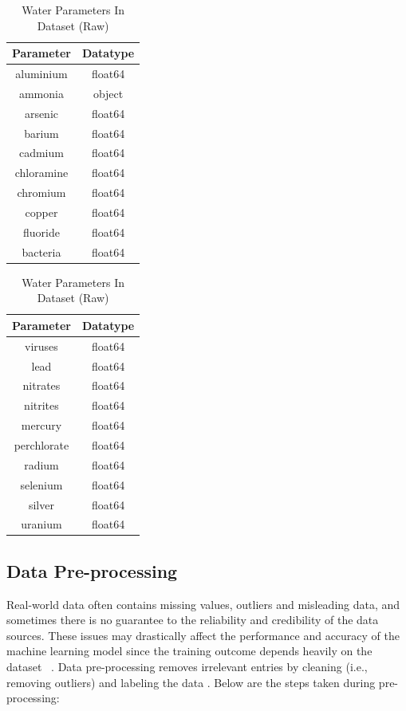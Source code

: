 \documentclass[conference]{IEEEtran}
\begin{document}
\begin{table}[htbp]
    \renewcommand{\arraystretch}{1.3}
    \caption{Water Parameters In Dataset (Raw)}
    \label{table:water_parameters}
    \centering
    \renewcommand{\arraystretch}{1.3}
    \setlength{\tabcolsep}{10pt}
    \begin{tabular}{c|c}
        \hline 
        \bfseries Parameter & \bfseries Datatype \\
        \hline  \hline
        aluminium & float64\\
        ammonia & object\\
        arsenic & float64\\
        barium  & float64\\
        cadmium & float64\\
        chloramine & float64\\
        chromium & float64\\
        copper & float64\\
        fluoride & float64\\
        bacteria & float64\\
    \hline
    \end{tabular}
    \quad
    \setlength{\tabcolsep}{10pt}
    \begin{tabular}{c|c}
        \hline
        \bfseries Parameter & \bfseries Datatype \\
        \hline \hline
        viruses & float64\\
        lead & float64\\
        nitrates & float64\\
        nitrites & float64\\
        mercury & float64\\
        perchlorate & float64\\
        radium & float64\\
        selenium & float64\\
        silver & float64\\
        uranium & float64\\
        \hline
    \end{tabular}
\end{table}

\subsection{Data Pre-processing}
Real-world data often contains missing values, outliers and misleading data, and sometimes there is no guarantee to the reliability and credibility of the data sources. These issues may drastically affect the performance and accuracy of the machine learning model since the training outcome depends heavily on the dataset ~\cite{gawhade2022}. Data pre-processing removes irrelevant entries by cleaning (i.e., removing outliers) and labeling the data \cite{nasir2022water}.
Below are the steps taken during pre-processing:
\end{document}
